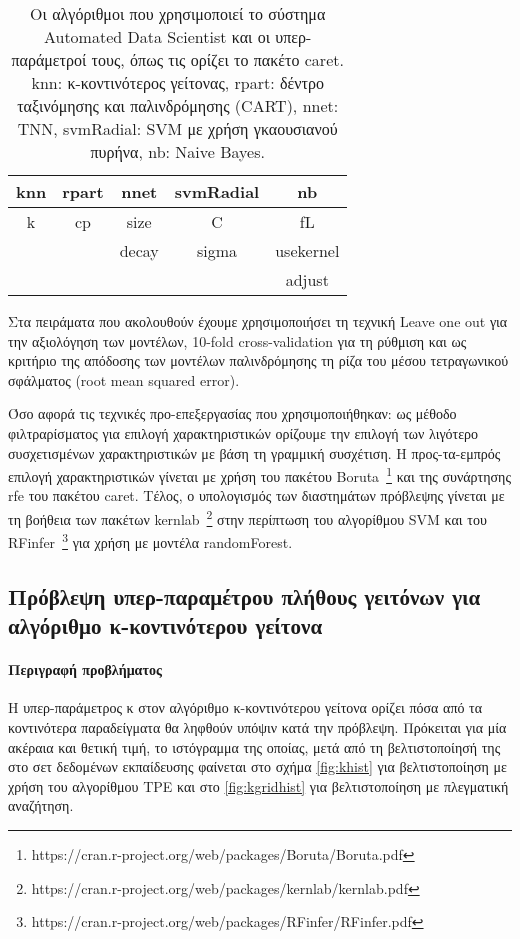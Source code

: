	\begin{table}[!htb]
		\begin{center}
				\caption[Οι αλγόριθμοι που χρησιμοποιεί το σύστημα Automated Data Scientist και οι υπερ-παράμετροί του]{Οι αλγόριθμοι που χρησιμοποιεί το σύστημα Automated Data Scientist και οι υπερ-παράμετροί τους, όπως τις ορίζει το πακέτο caret. knn: κ-κοντινότερος γείτονας, rpart: δέντρο ταξινόμησης και παλινδρόμησης (CART), nnet: \gls{ΤΝΝ}, svmRadial: \gls{SVM} με χρήση γκαουσιανού πυρήνα, nb: Naive Bayes.} \label{table:meta}
			\begin{tabular}{ |c|c|c|c|c| } 
				\hline
				knn & rpart & nnet & svmRadial & nb\\
				\hline
			    k & cp & size& C & fL\\
			     &  & decay& sigma & usekernel \\
			     &  &    & & adjust \\
				\hline
			\end{tabular}    
		\end{center}
		\label{table:algorithms}
	\end{table} 
	
Στα πειράματα που ακολουθούν έχουμε χρησιμοποιήσει τη τεχνική Leave one out για την αξιολόγηση των μοντέλων, 10-fold cross-validation για τη ρύθμιση και ως κριτήριο της απόδοσης των μοντέλων παλινδρόμησης τη ρίζα του μέσου τετραγωνικού σφάλματος (root mean squared error).

Όσο αφορά τις τεχνικές προ-επεξεργασίας που χρησιμοποιήθηκαν: ως μέθοδο φιλτραρίσματος για επιλογή χαρακτηριστικών ορίζουμε την επιλογή των λιγότερο συσχετισμένων χαρακτηριστικών με βάση τη γραμμική συσχέτιση. Η προς-τα-εμπρός επιλογή χαρακτηριστικών γίνεται με χρήση του πακέτου Boruta~\footnote{https://cran.r-project.org/web/packages/Boruta/Boruta.pdf} και της συνάρτησης rfe του πακέτου caret. Τέλος, ο υπολογισμός των διαστημάτων πρόβλεψης γίνεται με τη βοήθεια των πακέτων kernlab~\footnote{https://cran.r-project.org/web/packages/kernlab/kernlab.pdf} στην περίπτωση του αλγορίθμου \gls{SVM} και του RFinfer~\footnote{https://cran.r-project.org/web/packages/RFinfer/RFinfer.pdf} για χρήση με μοντέλα randomForest.
 
\subsection{Πρόβλεψη υπερ-παραμέτρου πλήθους γειτόνων για αλγόριθμο κ-κοντινότερου γείτονα}

\paragraph{Περιγραφή προβλήματος} Η υπερ-παράμετρος κ στον αλγόριθμο κ-κοντινότερου γείτονα ορίζει πόσα από τα κοντινότερα παραδείγματα θα ληφθούν υπόψιν κατά την πρόβλεψη. Πρόκειται για μία ακέραια και θετική τιμή, το ιστόγραμμα της οποίας, μετά από τη βελτιστοποίησή της στο σετ δεδομένων εκπαίδευσης φαίνεται στο σχήμα  \ref{fig:khist} για βελτιστοποίηση με χρήση του αλγορίθμου \gls{TPE} και στο \ref{fig:kgridhist} για βελτιστοποίηση με πλεγματική αναζήτηση.

